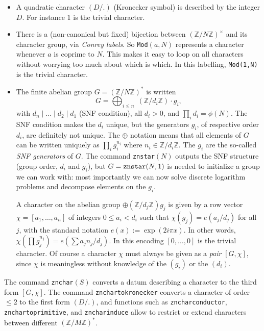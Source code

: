 \documentclass[11pt]{article}
\newcommand{\Z}{{\mathbb Z}}
\def\kbd#1{{\tt #1}}
\begin{document}
\begin{itemize}

\item A quadratic character $(D/.)$ (Kronecker symbol) is described by
the integer $D$. For instance $1$ is the trivial character.

\item There is a (non-canonical but fixed) bijection between $(\Z/N\Z)^\times$
and its character group, via \emph{Conrey labels}. So \kbd{Mod}$(a,N)$
represents a character whenever $a$ is coprime to $N$. This makes it easy
to loop on all characters without worrying too much about which is which.
In this labelling, \kbd{Mod(1,N)} is the trivial character.

\item The finite abelian group $G = (\Z/N\Z)^*$ is written
$$G = \bigoplus_{i\leq n}\; (\Z/d_i\Z) \cdot g_i,$$
with $d_n \mid \dots \mid d_2 \mid d_1$ (SNF condition), all $d_i > 0$, and
$\prod_i d_i = \phi(N)$. The SNF condition makes the $d_i$ unique, but the
generators $g_i$, of respective order $d_i$, are definitely not unique. The
$\oplus$ notation means that all elements of $G$ can be written uniquely as
$\prod_i g_i^{n_i}$ where $n_i \in \Z/d_i\Z$. The $g_i$ are the so-called
\emph{SNF generators} of $G$. The command \kbd{znstar}$(N)$ outputs the SNF
structure (group order, $d_i$ and  $g_i$), but $G = \kbd{znstar}(N, 1)$ is
needed to initialize a group we can work with: most importantly we can now
solve discrete logarithm problems and decompose elements on the $g_i$.

A character on the abelian group $\oplus (\Z/d_j\Z) g_j$ is given by a row
vector $\chi = [a_1,\ldots,a_n]$ of integers $0\leq a_i  < d_i$ such that
$\chi(g_j) = e(a_j / d_j)$ for all $j$, with the standard notation $e(x) :=
\exp(2i\pi x)$. In other words, $\chi(\prod g_j^{n_j}) = e(\sum a_j n_j /
d_j)$. In this encoding $[0,\dots,0]$ is the trivial character. Of course
a character $\chi$ must always be given as a \emph{pair} $[G,\chi]$,
since $\chi$ is meaningless without knowledge of the $(g_i)$ or the $(d_i)$.
\end{itemize}

The command \kbd{znchar}$(S)$ converts a datum describing a character to the
third form $[G,\chi]$. The command \kbd{znchartokronecker} converts a
character of order $\leq 2$ to the first form $(D/.)$, and functions such
as \kbd{zncharconductor}, \kbd{znchartoprimitive}, and \kbd{zncharinduce}
allow to restrict or extend characters between different $(\Z/M\Z)^*$.
\end{document}
